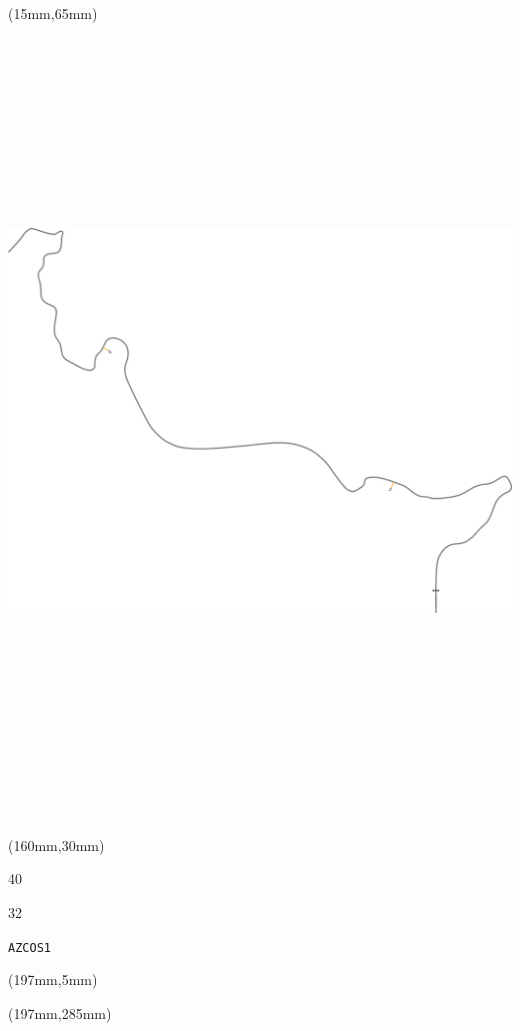 \begin{textblock*}{185mm}(15mm,65mm)%
\centering
\mbox{\includegraphics[width=185mm,height=210mm,keepaspectratio]{PT/AZCOS1.pdf}}
\end{textblock*}
\begin{textblock*}{40mm}(160mm,30mm)%
\Large
\par{} 
\par40 
\par32 
\par\hfill\tiny\tt AZCOS1\\
\end{textblock*}
\begin{textblock*}{20mm}(197mm,5mm)%
\fbox{\thepage}
\label{AZCOS1}
\end{textblock*}
\begin{textblock*}{20mm}(197mm,285mm)%
\fbox{\thepage}
\end{textblock*}

